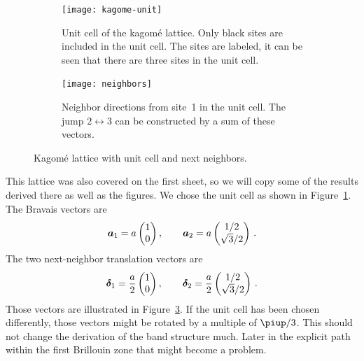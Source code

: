 \documentclass[11pt, english, fleqn, DIV=15, headinclude, BCOR=1cm]{scrartcl}
\begin{document}
\begin{figure}
    \begin{subfigure}[c]{0.48\linewidth}
    \centering
    \texttt{[image: kagome-unit]}
    \caption{%
        Unit cell of the kagomé lattice. Only black sites are included in the
        unit cell. The sites are labeled, it can be seen that there are three
        sites in the unit cell.
    }
    \label{fig:kagome-unit}
    \end{subfigure}
    \hfill
    \begin{subfigure}[c]{0.48\linewidth}
    \centering
    \texttt{[image: neighbors]}
    \caption{%
        Neighbor directions from site~1 in the unit cell. The jump $2
        \leftrightarrow 3$ can be constructed by a sum of these vectors.
    }
    \label{fig:neighbors}
    \end{subfigure}
    \caption{%
        Kagomé lattice with unit cell and next neighbors.
    }
\end{figure}

This lattice was also covered on the first sheet, so we will copy some of the
results derived there as well as the figures. We chose the unit cell as shown
in Figure~\ref{fig:kagome-unit}. The Bravais vectors are
\[
    \vec a_1 = a
    \begin{pmatrix}
        1 \\ 0
    \end{pmatrix}
    \eqnsep
    \vec a_2 = a
    \begin{pmatrix}
        1/2 \\ \sqrt{3} / 2
    \end{pmatrix} \,.
\]
The two next-neighbor translation vectors are
\[
    \vec \delta_1 = \frac a2
    \begin{pmatrix}
        1 \\ 0
    \end{pmatrix}
    \eqnsep
    \vec \delta_2 = \frac a2
    \begin{pmatrix}
        1/2 \\ \sqrt{3} / 2
    \end{pmatrix} \,.
\]
Those vectors are illustrated in Figure~\ref{fig:neighbors}. If the unit cell
has been chosen differently, those vectors might be rotated by a multiple of
$\piup/3$. This should not change the derivation of the band structure much.
Later in the explicit path within the first Brillouin zone that might become a
problem.
\end{document}
